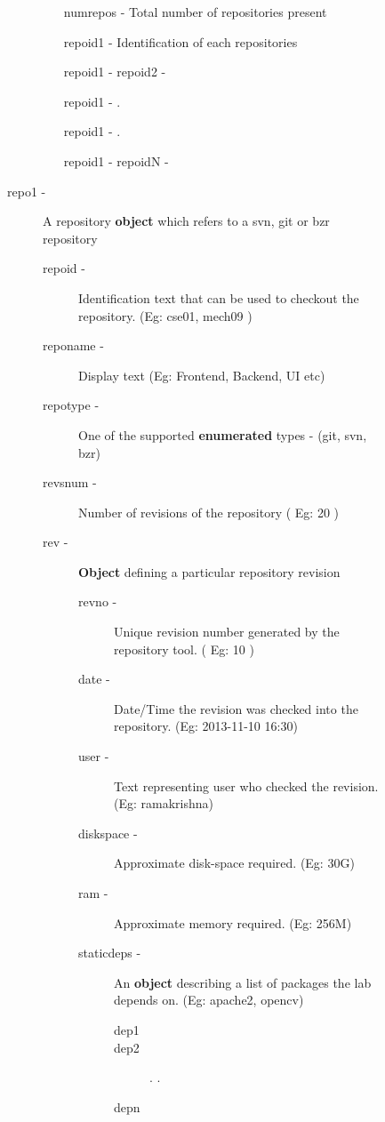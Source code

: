 \documentclass[11pt]{article}
\begin{document}
\begin{description}
\begin{description}
\begin{description}
\begin{itemize}
\item [numrepos -] Total number of repositories present
\item [repoid1 -] Identification of each repositories
\item [repoid1 -]repoid2 -
\item [repoid1 -].
\item [repoid1 -].
\item [repoid1 -]repoidN -
\end{itemize}

\item [repo1 -] A repository \textbf{object} which refers to a svn, git or bzr repository

\begin{description}
\item [repoid -] Identification text that can be used to checkout the repository. (Eg: cse01, mech09 )
\item [reponame -] Display text (Eg: Frontend, Backend, UI etc)
\item [repotype -] One of the supported \textbf{enumerated} types - (git, svn, bzr)
\item [revsnum -] Number of revisions of the repository ( Eg: 20 )
\item [rev -] \textbf{Object} defining a particular repository revision

\begin{description}
\item [revno -] Unique revision number generated by the repository tool. ( Eg: 10 )
\item [date -] Date/Time the revision was checked into the repository. (Eg: 2013-11-10 16:30)
\item [user -] Text representing user who checked the revision. (Eg: ramakrishna)
\item [diskspace -] Approximate disk-space required. (Eg: 30G)
\item [ram -] Approximate memory required. (Eg: 256M)
\item [staticdeps -] An \textbf{object} describing a list of packages the lab depends on. (Eg: apache2, opencv)

\begin{description}
\item [dep1]
\item [dep2]
                      .
                      .
\item [depn]
\end{description}


\end{description}
\end{description}
\end{description}
\end{description}
\end{description}
\end{document}
